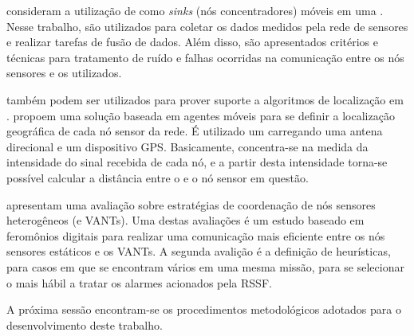\cite{Lucchi2007} consideram a utilização de \vants como \emph{sinks} (nós concentradores) móveis em uma \rssf. Nesse trabalho, \vants são utilizados para coletar os dados medidos pela rede de sensores e realizar tarefas de fusão de dados. Além disso, são apresentados critérios e técnicas para tratamento de ruído e falhas ocorridas na comunicação entre os nós sensores e os \vants utilizados.

\vants também podem ser utilizados para prover suporte a algoritmos de localização em \rssfs. \cite{Guerrero2009} propoem uma solução baseada em agentes móveis para se definir a localização geográfica de cada nó sensor da rede. É utilizado um \vant carregando uma antena direcional e um dispositivo GPS. Basicamente, concentra-se na medida da intensidade do sinal recebida de cada nó, e a partir desta intensidade torna-se possível calcular a distância entre o \vant e o nó sensor em questão.

\cite{Freitas20092} apresentam uma avaliação sobre estratégias de coordenação de nós sensores heterogêneos (\rssf e VANTs). Uma destas avaliações é um estudo baseado em feromônios digitais para realizar uma comunicação mais eficiente entre os nós sensores estáticos e os VANTs. A segunda avalição é a definição de heurísticas, para casos em que se encontram vários \vants em uma mesma missão, para se selecionar o \vant mais hábil a tratar os alarmes acionados pela RSSF.

A próxima sessão encontram-se os procedimentos metodológicos adotados para o desenvolvimento deste trabalho.
